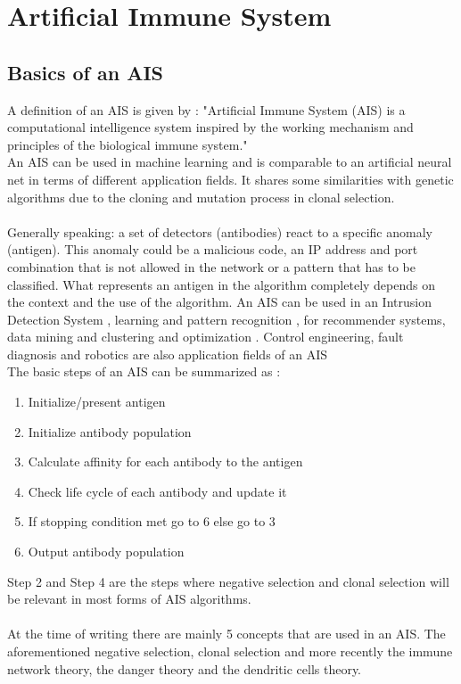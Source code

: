 \chapter{Artificial Immune System}
\label{chap:ais}
\section{Basics of an AIS}
A definition of an AIS is given by \cite[p. 5]{tan2016artificial}:
"Artificial Immune System (AIS) is a computational intelligence system inspired by the working mechanism and principles of the biological immune system."\\An AIS can be used in machine learning and is comparable to an artificial neural net in terms of different application fields.
It shares some similarities with genetic algorithms due to the cloning and mutation process in clonal selection.\\\\
Generally speaking: a set of detectors (antibodies) react to a specific anomaly (antigen). This anomaly could be a malicious code, an IP address and port combination that is not allowed in the network or a pattern that has to be classified. What represents an antigen in the algorithm completely depends on the context and the use of the algorithm. An AIS can be used in an Intrusion Detection System \cite{PAM17}, learning and pattern recognition \cite{DEC02}, for recommender systems, data mining and clustering \cite{burke2013} and optimization \cite{NAN08}. Control engineering, fault diagnosis and robotics are also application fields of an AIS \cite{tan2016artificial}\\

The basic steps of an AIS can be summarized as \cite{tan2016artificial}:
\begin{enumerate}
	\item 	Initialize/present antigen
	\item 	Initialize antibody population
	\item 	Calculate affinity for each antibody to the antigen
	\item 	Check life cycle of each antibody and update it
	\item 	If stopping condition met go to 6 else go to 3
	\item 	Output antibody population
\end{enumerate}
Step 2 and Step 4 are the steps where negative selection and clonal selection will be relevant in most forms of AIS algorithms.\\\\
At the time of writing there are mainly 5 concepts that are used in an AIS. The aforementioned negative selection, clonal selection and more recently the immune network theory, the danger theory and the dendritic cells theory. 

